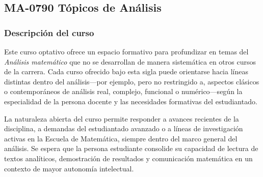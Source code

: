 \newpage
\subsection*{MA-0790 Tópicos de Análisis}

\hypertarget{MA0790}{}
\begin{refsection}
\begin{table}[H]
\end{table}

\subsubsection*{Descripción del curso}

Este curso optativo ofrece un espacio formativo para profundizar en temas del \emph{Análisis matemático} que no se desarrollan de manera sistemática en otros cursos de la carrera. Cada curso ofrecido bajo esta sigla puede orientarse hacia líneas distintas dentro del análisis---por ejemplo, pero no restringido a, aspectos clásicos o contemporáneos de análisis real, complejo, funcional o numérico---según la especialidad de la persona docente y las necesidades formativas del estudiantado.

La naturaleza abierta del curso permite responder a avances recientes de la disciplina, a demandas del estudiantado avanzado o a líneas de investigación activas en la Escuela de Matemática, siempre dentro del marco general del análisis. Se espera que la persona estudiante consolide su capacidad de lectura de textos analíticos, demostración de resultados y comunicación matemática en un contexto de mayor autonomía intelectual.


\end{refsection}
